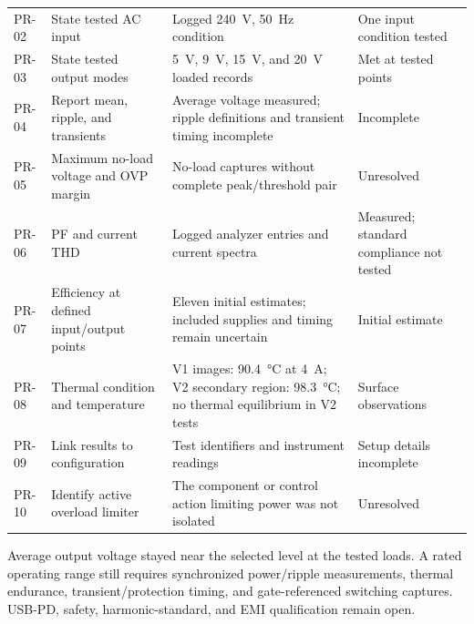 \begin{table}[htbp]
\begin{tabularx}{\textwidth}{@{}L{0.08\textwidth}L{0.25\textwidth}X L{0.17\textwidth}@{}}
PR-02 & State tested AC input & Logged \SI{240}{\volt}, \SI{50}{\hertz} condition & One input condition tested\\
PR-03 & State tested output modes & \SI{5}{\volt}, \SI{9}{\volt}, \SI{15}{\volt}, and \SI{20}{\volt} loaded records & Met at tested points\\
PR-04 & Report mean, ripple, and transients & Average voltage measured; ripple definitions and transient timing incomplete & Incomplete\\
PR-05 & Maximum no-load voltage and OVP margin & No-load captures without complete peak/threshold pair & Unresolved\\
PR-06 & PF and current THD & Logged analyzer entries and current spectra & Measured; standard compliance not tested\\
PR-07 & Efficiency at defined input/output points & Eleven initial estimates; included supplies and timing remain uncertain & Initial estimate\\
PR-08 & Thermal condition and temperature & V1 images: \SI{90.4}{\celsius} at \SI{4}{\ampere}; V2 secondary region: \SI{98.3}{\celsius}; no thermal equilibrium in V2 tests & Surface observations\\
PR-09 & Link results to configuration & Test identifiers and instrument readings & Setup details incomplete\\
PR-10 & Identify active overload limiter & The component or control action limiting power was not isolated & Unresolved\\
\bottomrule
\end{tabularx}
\end{table}
\FloatBarrier

Average output voltage stayed near the selected level at the tested loads. A rated
operating range still requires synchronized power/ripple measurements,
thermal endurance, transient/protection timing, and gate-referenced switching
captures. USB-PD, safety, harmonic-standard, and EMI qualification remain open.
